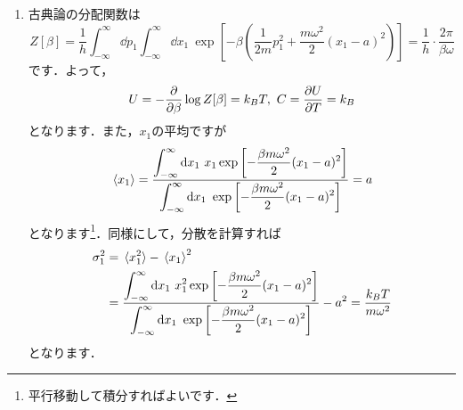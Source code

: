 \documentclass[a4paper,pdflatex,ja=standard]{bxjsarticle}
\begin{document}
\begin{enumerate}
  \item 
  古典論の分配関数は
  \begin{equation}
    Z[\beta]
    =
    \frac{1}{h}
    \int_{-\infty}^{\infty}\dd p_1
    \int_{-\infty}^{\infty}\dd x_1\ 
    \exp\left[ -\beta 
    \left(  
      \frac{1}{2m}p_1^2
      +
      \frac{m\omega^2}{2}(x_1-a)^2
    \right)\right]
    =
    \frac{1}{h}
    \cdot
    \frac{2\pi}{\beta\omega}
  \end{equation}
  です．よって，
  \begin{equation}
    U
    =
    -\pdv{}{\beta}\log Z[\beta]
    =
    k_B T
    ,\ 
    C
    =
    \pdv{U}{T}
    =
    k_B
  \end{equation}
  となります．また，$x_1$の平均ですが
  \begin{equation}
    \ev*{x_1}
    =
    \dfrac{\displaystyle
      \int_{-\infty}^{\infty}\dd x_1\ 
      x_1
      \exp
      \left[  
        -\frac{\beta m\omega^2}{2}(x_1-a)^2
      \right]
    }{\displaystyle
      \int_{-\infty}^{\infty}\dd x_1\ 
      \exp
      \left[  
        -\frac{\beta m\omega^2}{2}(x_1-a)^2
      \right]
    }
    =
    a
  \end{equation}
  となります\footnote{
    平行移動して積分すればよいです．
  }．同様にして，分散を計算すれば
  \begin{align}
    \sigma_1^2
    &=
    \ev*{x_1^2}-\ev*{x_1}^2
    \nonumber
    \\
    &=
    \frac{\displaystyle
      \int_{-\infty}^{\infty}\dd x_1\ 
      x_1^2
      \exp
      \left[  
        -\frac{\beta m\omega^2}{2}(x_1-a)^2
      \right]
    }{\displaystyle
      \int_{-\infty}^{\infty}\dd x_1\ 
      \exp
      \left[  
        -\frac{\beta m\omega^2}{2}(x_1-a)^2
      \right]
    }
    -
    a^2
    =
    \frac{k_BT}{m\omega^2}
  \end{align}
  となります．


\end{enumerate}
\end{document}
